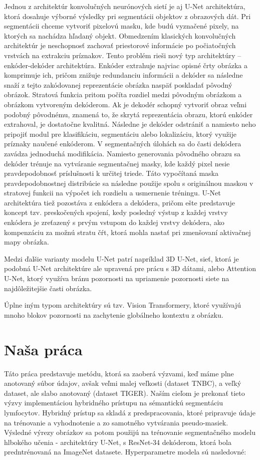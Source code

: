 Jednou z architektúr konvolučných neurónových sietí je aj U-Net architektúra, ktorá dosahuje výborné výsledky pri segmentácii objektov z obrazových dát. Pri segmentácii chceme vytvoriť pixelovú masku, kde budú vyznačené pixely, na ktorých sa nachádza hľadaný objekt. Obmedzením klasických konvolučných architektúr je neschopnosť zachovať priestorové informácie po počiatočných vrstvách na extrakciu príznakov. Tento problém rieši nový typ architektúry – enkóder-dekóder architektúra. Enkóder extrahuje najviac opisné črty obrázka a komprimuje ich, pričom znižuje redundanciu informácii a dekóder sa následne snaží z tejto zakódovanej reprezentácie obrázka naspäť poskladať pôvodný obrázok. Stratová funkcia pritom počíta rozdiel medzi pôvodným obrázkom a obrázkom vytvoreným dekóderom. Ak je dekodér schopný vytvoriť obraz veľmi podobný pôvodnému, znamená to, že skrytá reprezentácia obrazu, ktorú enkóder extrahoval, je dostatočne kvalitná. Následne je dekóder odstrániť a namiesto neho pripojiť modul pre klasifikáciu, segmentáciu alebo lokalizáciu, ktorý využije príznaky naučené enkóderom. V segmentačných úlohách sa do časti dekódera zavádza jednoduchá modifikácia. Namiesto generovania pôvodného obrazu sa dekóder trénuje na vytváranie segmentačnej masky, kde každý pixel nesie pravdepodobnosť príslušnosti k určitej triede. Táto vypočítaná maska pravdepodobnostnej distribúcie sa následne použije spolu s originálnou maskou v stratovej funkcii na výpočet ich rozdielu a usmernenie tréningu. U-Net architektúra tiež pozostáva z enkódera a dekódera, pričom ešte predstavuje koncept tzv. preskočených spojení, kedy posledný výstup z každej vrstvy enkódera je zreťazený s prvým vstupom do každej vrstvy dekódera, ako kompenzáciu za možnú stratu čŕt, ktorá mohla nastať pri zmenšovaní aktivačnej mapy obrázka.

Medzi ďalšie varianty modelu U-Net patrí napríklad 3D U-Net, sieť, ktorá je podobná U-Net architektúre ale upravená pre prácu s 3D dátami, alebo Attention U-Net, ktorý využíva bránu pozornosti na upriamenie pozornosti siete na najdôležitejšie časti obrázka.

Úplne iným typom architektúry sú tzv. Vision Transformery, ktoré využívajú mnoho blokov pozornosti na zachytenie globálneho kontextu z obrázku.

\section{Naša práca}
Táto práca predstavuje metódu, ktorá sa zaoberá výzvami, keď máme plne anotovaný súbor údajov, avšak veľmi malej veľkosti (dataset TNBC), a veľký dataset, ale slabo anotovaný (dataset TIGER). Naším cieľom je prekonať tieto výzvy implementáciou hybridného prístupu na sémantickú segmentáciu lymfocytov. Hybridný prístup sa skladá z predspracovania, ktoré pripravuje údaje na trénovanie a vyhodnotenie a zo samotného vytvárania pseudo-masiek. Výsledné výrezy obrázkov sa potom použijú na trénovanie segmentačného modelu hlbokého učenia - architektúry U-Net, s ResNet-34 dekóderom, ktorá bola predntrénovaná na ImageNet datasete. Hyperparametre modela sú nasledovné:

